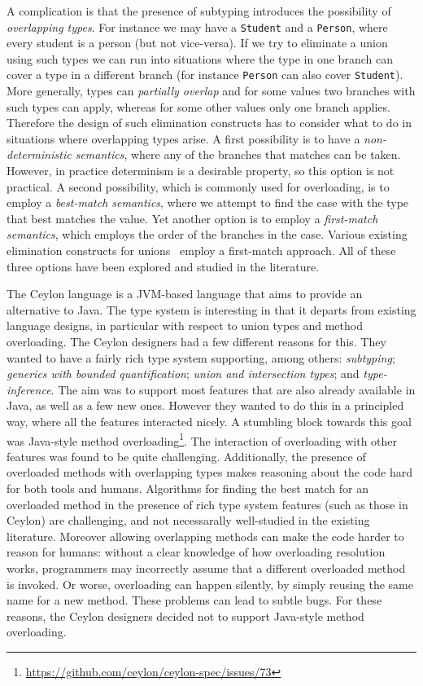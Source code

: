A complication is that the presence of subtyping introduces the
possibility of \emph{overlapping types}. For instance we may have a
\lstinline{Student} and a \lstinline{Person}, where every student is a person (but not
vice-versa). If we try to eliminate a union using such types we can
run into situations where the type in one branch can cover a type in a
different branch (for instance \lstinline{Person} can also cover
\lstinline{Student}). More generally, types can \emph{partially overlap}
and for some values two branches with such types can apply, whereas
for some other values only one branch applies.
Therefore the design of such elimination constructs has to
consider what to do in situations where overlapping types arise.  A
first possibility is to have a \emph{non-deterministic semantics},
where any of the branches that matches can be taken. However, in
practice determinism is a desirable property,
so this option is not practical. A second possibility, which is
commonly used for overloading, is to employ a \emph{best-match
  semantics}, where we attempt to find the case with the type that
best matches the value. Yet another option is to employ a
\emph{first-match semantics}, which employs the order of the branches
in the case. Various existing elimination constructs for unions~\cite{}
employ a first-match approach. All of these three options have been explored
and studied in the literature. 

The Ceylon language is a JVM-based language that aims to provide an
alternative to Java. The type system is interesting
in that it departs from existing language designs, in particular
with respect to union types and method overloading.
The Ceylon designers had a few different
reasons for this. They wanted to have a fairly rich type system
supporting, among others: \emph{subtyping}; \emph{generics with bounded
quantification}; \emph{union and intersection types}; and \emph{type-inference}.
The aim was to support most features that are also already available
in Java, as well as a few new ones. However they wanted to do this in
a principled way, where all the features interacted nicely.  A
stumbling block towards this goal was Java-style method
overloading\footnote{\url{https://github.com/ceylon/ceylon-spec/issues/73}}.
The interaction of overloading with other
features was found to be quite challenging. Additionally, the presence of
overloaded methods with overlapping types
makes reasoning about the code hard 
for both tools and humans. Algorithms for finding the best match for an
overloaded method in the presence of rich type system features (such as
those in Ceylon) are challenging, and not necessarally well-studied in the
existing literature. Moreover allowing overlapping methods can make
the code harder to reason for humans: without a clear knowledge of how
overloading resolution works, programmers may incorrectly assume that
a different overloaded method is invoked. Or worse, overloading can
happen silently, by simply reusing the same name for a new
method. These problems can lead to subtle bugs.
For these reasons, the Ceylon designers decided not to support
Java-style method overloading.

